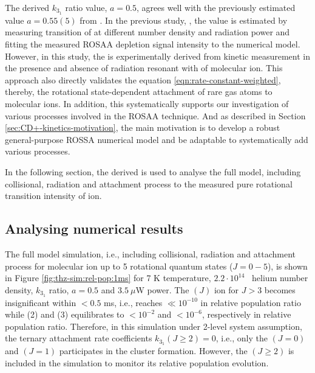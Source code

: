 The derived $k_{3_1}$ ratio value, $a=0.5$, agrees well with the previously
estimated value $a=0.55(5)$ from \citet{Brunken2017}. In the previous study,
\cite{Brunken2017}, the  value is estimated by measuring \CDline
transition of \CD at different number density and radiation power and fitting
the measured ROSAA depletion signal intensity to the numerical model. However,
in this study, the  is experimentally derived from kinetic measurement
in the presence and absence of radiation resonant with \CDline of \CD molecular
ion. This approach also directly validates the equation
\ref{eqn:rate-constant-weighted}, thereby, the rotational state-dependent
attachment of rare gas atoms to molecular ions. In addition, this
systematically supports our investigation of various processes involved in the
ROSAA technique. And as described in Section \ref{sec:CD+-kinetics-motivation},
the main motivation is to develop a robust general-purpose ROSSA numerical
model and be adaptable to systematically add various processes.

In the following section, the derived  is used to analyse the full
model, including collisional, radiation and attachment process to the measured
pure rotational transition intensity of \CD ion.

\subsection{Analysing numerical results}
\label{subsec:CD+-kinetics-simulation-analysis}

The full model simulation, i.e., including collisional, radiation and
attachment process for \CD molecular ion up to 5 rotational quantum states
($J=0-5$), is shown in Figure \ref{fig:thz-sim:rel-pop:1ms} for 7 K
temperature, $2.2 \cdot 10^{14}$ \percc\ helium number density, $k_{3_1}$
ratio, $a=0.5$ and $3.5\ \mu$W power.
The \CD$(J)$ ion for $J>3$ becomes insignificant within $<0.5$ ms, i.e.,
reaches $\ll 10^{-10}$ in relative population ratio while \CD(2) and \CD(3)
equilibrates to $<10^{-2}$ and $<10^{-6}$, respectively in relative population
ratio. Therefore, in this simulation under 2-level system assumption, the
ternary attachment rate coefficients $k_{3_1}(J\geq 2)=0$, i.e., only the
\CD$(J=0)$ and \CD$(J=1)$ participates in the cluster formation. However, the
\CD$(J \geq 2)$ is included in the simulation to monitor its relative
population evolution.

